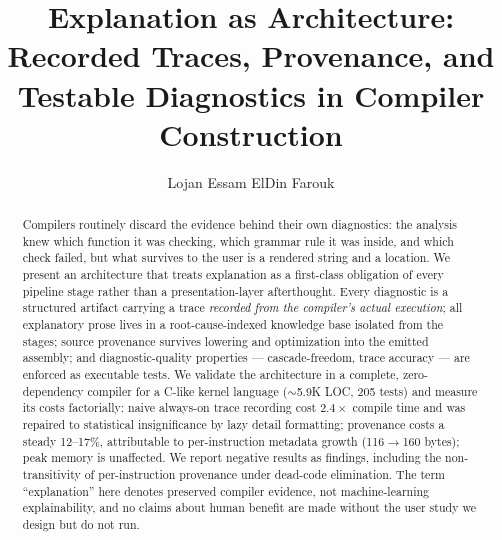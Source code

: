 \documentclass[sigplan,10pt,review]{acmart}
\begin{document}
\title{Explanation as Architecture: Recorded Traces, Provenance, and
Testable Diagnostics in Compiler Construction}

\author{Lojan Essam ElDin Farouk}

\begin{abstract}
Compilers routinely discard the evidence behind their own
diagnostics: the analysis knew which function it was checking, which
grammar rule it was inside, and which check failed, but what survives
to the user is a rendered string and a location. We present an
architecture that treats explanation as a first-class obligation of
every pipeline stage rather than a presentation-layer afterthought.
Every diagnostic is a structured artifact carrying a trace
\emph{recorded from the compiler's actual execution}; all explanatory
prose lives in a root-cause-indexed knowledge base isolated from the
stages; source provenance survives lowering and optimization into the
emitted assembly; and diagnostic-quality properties --- cascade-freedom,
trace accuracy --- are enforced as executable tests. We validate the
architecture in a complete, zero-dependency compiler for a C-like
kernel language ($\sim$5.9K LOC, 205 tests) and measure its costs
factorially: naive always-on trace recording cost $2.4\times$ compile
time and was repaired to statistical insignificance by lazy detail
formatting; provenance costs a steady 12--17\%, attributable to
per-instruction metadata growth (116$\to$160 bytes); peak memory is
unaffected. We report negative results as findings, including the
non-transitivity of per-instruction provenance under dead-code
elimination. The term ``explanation'' here denotes preserved compiler
evidence, not machine-learning explainability, and no claims about
human benefit are made without the user study we design but do not
run.
\end{abstract}

\maketitle

















\end{document}
